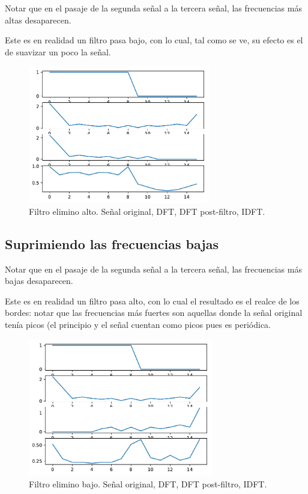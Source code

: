 \documentclass[11pt, spanish]{article}
\begin{document}
Notar que en el pasaje de la segunda señal a la tercera señal, las frecuencias más altas desaparecen.

Este es en realidad un filtro pasa bajo, con lo cual, tal como se ve, su efecto es el de suavizar un poco la señal.
\begin{figure}[H]
\centering
  \includegraphics[height=6cm]{informe-imgs/ej2-elimino-alto.pdf}
  \caption{Filtro elimino alto. Señal original, DFT, DFT post-filtro, IDFT.}
\end{figure}

\subsection{Suprimiendo las frecuencias bajas}

Notar que en el pasaje de la segunda señal a la tercera señal, las frecuencias más bajas desaparecen.

Este es en realidad un filtro pasa alto, con lo cual el resultado es el realce de los bordes: notar que las frecuencias
más fuertes son aquellas donde la señal original tenía picos (el principio y el señal cuentan como picos pues es
periódica.

\begin{figure}[H]
\centering
  \includegraphics[height=6cm]{informe-imgs/ej2-elimino-bajo.pdf}
  \caption{Filtro elimino bajo. Señal original, DFT, DFT post-filtro, IDFT.}
\end{figure}
\end{document}
